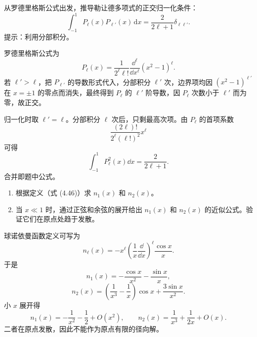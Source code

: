 \begin{question}
从罗德里格斯公式出发，推导勒让德多项式的正交归一化条件：
\[
\int_{-1}^{1}P_\ell(x)P_{\ell'}(x)\,\mathrm dx=\frac{2}{2\ell+1}\delta_{\ell\ell'}.
\]
提示：利用分部积分。
\end{question}
\begin{solution}

罗德里格斯公式为
\[
P_\ell(x)=\frac{1}{2^\ell\ell!}\frac{\dd^\ell}{\dd x^\ell}(x^2-1)^\ell.
\]
若 $\ell'>\ell$，把 $P_{\ell'}$ 的导数形式代入，分部积分 $\ell'$ 次，边界项均因 $(x^2-1)^{\ell'}$ 在 $x=\pm1$ 的零点而消失，最终得到 $P_\ell$ 的 $\ell'$ 阶导数，因 $P_\ell$ 次数小于 $\ell'$ 而为零，故正交。

归一化时取 $\ell'=
\ell$。分部积分 $\ell$ 次后，只剩最高次项。由 $P_\ell$ 的首项系数
\[
\frac{(2\ell)!}{2^\ell(\ell!)^2}x^\ell
\]
可得
\[
\int_{-1}^1P_\ell^2(x)\dd x=\frac{2}{2\ell+1}.
\]
合并即题中公式。

\end{solution}

\begin{question}
\begin{enumerate}
\item 根据定义（式 (4.46)）求 $n_1(x)$ 和 $n_2(x)$。
\item 当 $x\ll1$ 时，通过正弦和余弦的展开给出 $n_1(x)$ 和 $n_2(x)$ 的近似公式。验证它们在原点处趋于发散。
\end{enumerate}

\par\smallskip
{}

\end{question}
\begin{solution}

球诺依曼函数定义可写为
\[
n_\ell(x)=-x^\ell\left(\frac{1}{x}\frac{\dd}{\dd x}\right)^\ell\frac{\cos x}{x}.
\]
于是
\[
n_1(x)=-\frac{\cos x}{x^2}-\frac{\sin x}{x},
\]
\[
n_2(x)=\left(\frac{1}{x^3}-\frac{1}{x}\right)\cos x+\frac{3\sin x}{x^2}.
\]
小 $x$ 展开得
\[
n_1(x)=-\frac1{x^2}-\frac12+O(x^2),
\qquad
n_2(x)=\frac{1}{x^3}+\frac{1}{2x}+O(x).
\]
二者在原点发散，因此不能作为原点有限的径向解。

\end{solution}

